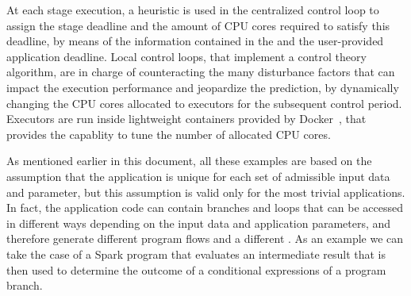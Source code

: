 At each stage execution, a heuristic is used in the centralized control loop to assign the stage deadline and the amount of CPU cores required to satisfy this deadline, by means of the information contained in the \plan and the user-provided application deadline. Local control loops, that implement a control theory algorithm, are in charge of counteracting the many disturbance factors that can impact the execution performance and jeopardize the prediction, by dynamically changing the CPU cores allocated to executors for the subsequent control period.  Executors are run inside lightweight containers provided by Docker~\cite{misc:Docker}, that provides the capablity to tune the number of allocated CPU cores. 




As mentioned earlier in this document, all these examples are based on the assumption that the application \plan is unique for each set of admissible input data and parameter, but this assumption is valid only for the most trivial applications. In fact, the application code can contain branches and loops that can be accessed in different ways depending on the input data and application parameters, and therefore generate different program flows and a different \plan. As an example we can take the case of a Spark program that evaluates an intermediate result that is then used to determine the outcome of a conditional expressions of a program branch.

